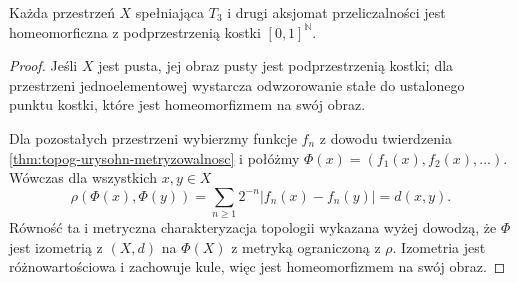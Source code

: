 \begin{wniosek}
\label{cor:topog-urysohn-kostka-hilberta}
Każda przestrzeń $X$ spełniająca $T_3$ i drugi aksjomat
przeliczalności jest homeomorficzna z podprzestrzenią
kostki $[0,1]^{\mathbb N}$.
\end{wniosek}
\begin{proof}
Jeśli $X$ jest pusta, jej obraz pusty jest podprzestrzenią
kostki; dla przestrzeni jednoelementowej wystarcza odwzorowanie
stałe do ustalonego punktu kostki, które jest homeomorfizmem
na swój obraz.

Dla pozostałych przestrzeni wybierzmy funkcje $f_n$
z dowodu twierdzenia \ref{thm:topog-urysohn-metryzowalnosc}
i połóżmy
$\Phi(x)=(f_1(x),f_2(x),\ldots)$.
Wówczas dla wszystkich $x,y\in X$
\[
\rho(\Phi(x),\Phi(y))
=\sum_{n\ge1}2^{-n}|f_n(x)-f_n(y)|=d(x,y).
\]
Równość ta i metryczna charakteryzacja topologii
wykazana wyżej dowodzą, że $\Phi$ jest izometrią
z $(X,d)$ na $\Phi(X)$ z metryką ograniczoną z $\rho$.
Izometria jest różnowartościowa i zachowuje kule,
więc jest homeomorfizmem na swój obraz.
\end{proof}

